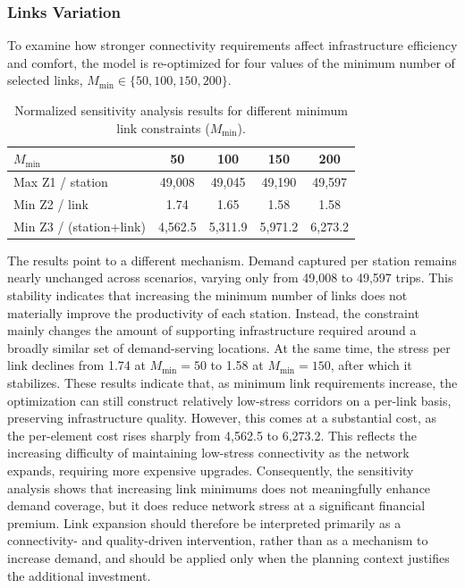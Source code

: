 \documentclass[preprint,authoryear,10pt]{elsarticle}
\begin{document}
\subsubsection{Links Variation}

To examine how stronger connectivity requirements affect infrastructure efficiency and comfort, the model is re-optimized for four values of the minimum number of selected links, $M_{\min}\in\{50,100,150,200\}$.

\begin{table}[htbp]
  \caption{Normalized sensitivity analysis results for different minimum link constraints ($M_{\min}$).}
  \label{tab:sensitivity_mmin_normalized}
  \centering
  \small
  \begin{tabular}{@{}lcccc@{}}
    \hline
    \textbf{$M_{\min}$} & \textbf{50} & \textbf{100} & \textbf{150} & \textbf{200} \\
    \hline
    Max Z1 / station & 49,008 & 49,045 & 49,190 & 49,597 \\
    Min Z2 / link    & 1.74   & 1.65   & 1.58   & 1.58  \\
    Min Z3 / (station+link) & 4,562.5 & 5,311.9 & 5,971.2 & 6,273.2 \\
    \hline
  \end{tabular}
\end{table}

The results point to a different mechanism. Demand captured per station remains nearly unchanged across scenarios, varying only from 49,008 to 49,597 trips. This stability indicates that increasing the minimum number of links does not materially improve the productivity of each station. Instead, the constraint mainly changes the amount of supporting infrastructure required around a broadly similar set of demand-serving locations. At the same time, the stress per link declines from 1.74 at $M_{\min}=50$ to 1.58 at $M_{\min}=150$, after which it stabilizes. These results indicate that, as minimum link requirements increase, the optimization can still construct relatively low-stress corridors on a per-link basis, preserving infrastructure quality. However, this comes at a substantial cost, as the per-element cost rises sharply from 4,562.5 to 6,273.2. This reflects the increasing difficulty of maintaining low-stress connectivity as the network expands, requiring more expensive upgrades. Consequently, the sensitivity analysis shows that increasing link minimums does not meaningfully enhance demand coverage, but it does reduce network stress at a significant financial premium. Link expansion should therefore be interpreted primarily as a connectivity- and quality-driven intervention, rather than as a mechanism to increase demand, and should be applied only when the planning context justifies the additional investment.
\end{document}
